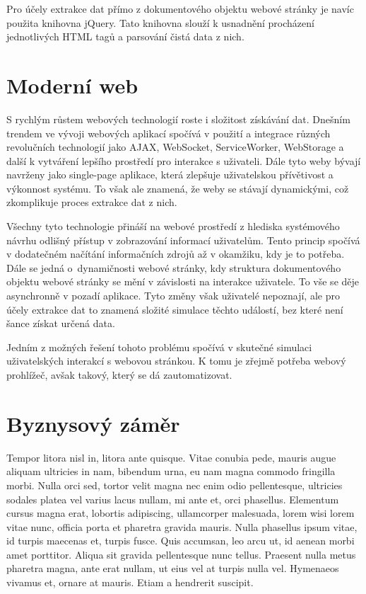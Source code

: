 \documentclass[11pt,a4paper]{article}
\begin{document}
Pro účely extrakce dat přímo z dokumentového objektu webové stránky je navíc použita knihovna jQuery. Tato knihovna slouží k usnadnění procházení jednotlivých HTML tagů a parsování čistá data z nich.


\section{Moderní web}
S rychlým růstem webových technologií roste i složitost získávání dat. Dnešním trendem ve vývoji webových aplikací spočívá v použití a integrace různých revolučních technologií jako AJAX, WebSocket, ServiceWorker, WebStorage a další k vytváření lepšího prostředí pro interakce s uživateli. Dále tyto weby bývají navrženy jako single-page aplikace, která zlepšuje uživatelskou přívětivost a výkonnost systému. To však ale znamená, že weby se stávají dynamickými, což zkomplikuje proces extrakce dat z nich.

Všechny tyto technologie přináší na webové prostředí z hlediska systémového návrhu odlišný přístup v zobrazování informací uživatelům. Tento princip spočívá v dodatečném načítání informačních zdrojů až v okamžiku, kdy je to potřeba. Dále se jedná o~dynamičnosti webové stránky, kdy struktura dokumentového objektu webové stránky se mění v závislosti na interakce uživatele. To vše se děje asynchronně v pozadí aplikace. Tyto změny však uživatelé nepoznají, ale pro účely extrakce dat to znamená složité simulace těchto událostí, bez které není šance získat určená data.

Jedním z možných řešení tohoto problému spočívá v skutečné simulaci uživatelských interakcí s webovou stránkou. K tomu je zřejmě potřeba webový prohlížeč, avšak takový, který se dá zautomatizovat.

\section{Byznysový záměr}
Tempor litora nisl in, litora ante quisque. Vitae conubia pede, mauris augue aliquam ultricies in nam, bibendum urna, eu nam magna commodo fringilla morbi. Nulla orci sed, tortor velit magna nec enim odio pellentesque, ultricies sodales platea vel varius lacus nullam, mi ante et, orci phasellus. Elementum cursus magna erat, lobortis adipiscing, ullamcorper malesuada, lorem wisi lorem vitae nunc, officia porta et pharetra gravida mauris. Nulla phasellus ipsum vitae, id turpis maecenas et, turpis fusce. Quis accumsan, leo arcu ut, id aenean morbi amet porttitor. Aliqua sit gravida pellentesque nunc tellus. Praesent nulla metus pharetra magna, ante erat nullam, ut eius vel at turpis nulla vel. Hymenaeos vivamus et, ornare at mauris. Etiam a hendrerit suscipit.
\end{document}
